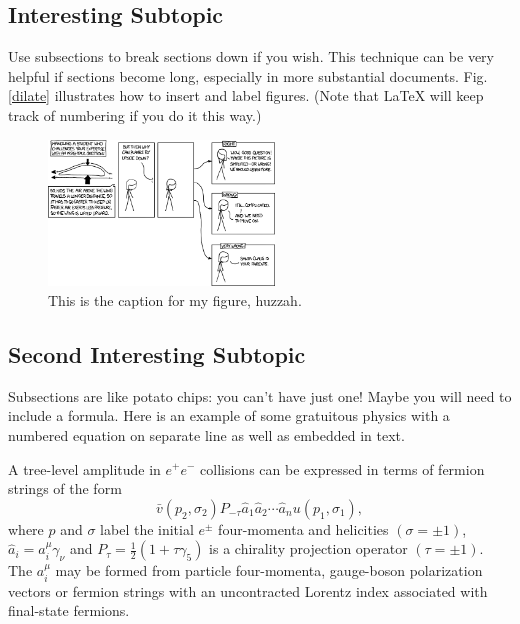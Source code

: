 \documentclass[twocolumn,12pt]{article}
\begin{document}
\subsection{Interesting Subtopic}

Use subsections to break sections down if you wish.  This technique can be very helpful if sections become long, especially in more substantial documents. Fig.\ref{dilate} illustrates how to insert and label figures.  (Note that LaTeX will keep track of numbering if you do it this way.) 

\begin{figure}
\begin{center}
\includegraphics[width=6cm]{airfoil.png}
\caption{This is the caption for my figure, huzzah. \cite{c-ref}}
\label{fig:xkcdAirfoil}
\end{center}
\end{figure}

\subsection{Second Interesting Subtopic}

Subsections are like potato chips:  you can't have just one!  Maybe you will need to include a formula.  Here is an example of some gratuitous physics with a numbered equation on separate line as well as embedded in text.

A tree-level amplitude in $e^+e^-$ collisions can be expressed in
terms of fermion strings of the form
\begin{equation}
\bar v(p_2,\sigma_2)P_{-\tau}\hat a_1\hat a_2\cdots
\hat a_nu(p_1,\sigma_1) ,
\end{equation}
where $p$ and $\sigma$ label the initial $e^{\pm}$ four-momenta
and helicities $(\sigma = \pm 1)$, $\hat a_i=a^\mu_i\gamma_\nu$
and $P_\tau=\frac{1}{2}(1+\tau\gamma_5)$ is a chirality projection
operator $(\tau = \pm1)$.  The $a^\mu_i$ may be formed from particle
four-momenta, gauge-boson polarization vectors or fermion strings with
an uncontracted Lorentz index associated with final-state fermions.
\end{document}
